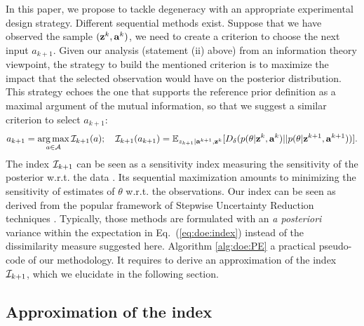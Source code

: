 In this paper, we propose to tackle degeneracy with an appropriate experimental design strategy. 
Different sequential methods exist. Suppose that we have observed the sample $(\mathbf{z}^k,\mathbf{a}^k)$, we need to create a criterion to choose the next input $a_{k+1}$. 
Given our analysis (statement (ii) above) from an information theory viewpoint, the strategy to build the mentioned criterion is to maximize the impact that the selected observation would have on the posterior distribution. 
This strategy echoes the one that supports the reference prior definition as a maximal argument of the mutual information, so that we suggest a similar criterion to select $a_{k+1}$:
      \begin{equation}\label{eq:doe:index}
        a_{k+1}=\operatorname*{arg\,max}_{a\in\mathcal{A}}\mathcal{I}_{k+1}(a);\quad 
            \mathcal{I}_{k+1}(a_{k+1}) = \mathbb{E}_{{z_{k+1}}|\mathbf{a}^{k+1},\mathbf{z}^k}[D_\delta(p(\theta|\mathbf{z}^k,\mathbf{a}^k)||p(\theta|\mathbf{z}^{k+1},\mathbf{a}^{k+1}))].
    \end{equation}
The index $\mathcal{I}_{k+1}$ can be seen as a sensitivity index measuring the sensitivity of the posterior w.r.t. the data \citep{da_veiga_global_2015}. Its sequential maximization amounts to minimizing the sensitivity of estimates of $\theta$ w.r.t. the observations.
Our index can be seen as derived from the popular framework of Stepwise Uncertainty Reduction techniques \citep{bect_supermartingale_2019}. 
Typically,  those methods are formulated with an \emph{a posteriori} variance within the expectation in Eq.~(\ref{eq:doe:index}) instead of the dissimilarity measure suggested here.
Algorithm \ref{alg:doe:PE} a practical pseudo-code of our methodology. It requires to derive an approximation of the index $\mathcal{I}_{k+1}$, which we elucidate in the following section.


\subsection{Approximation of the index}

